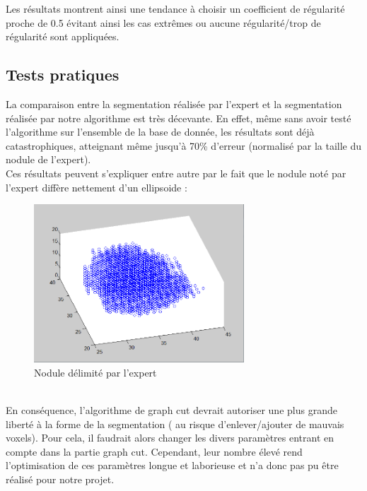 \documentclass{article}
\begin{document}
Les résultats montrent ainsi une tendance à choisir un coefficient de régularité proche de 0.5 évitant ainsi les cas extrêmes ou aucune régularité/trop de régularité sont appliquées.

\subsection{Tests pratiques}

La comparaison entre la segmentation réalisée par l'expert et la segmentation réalisée par notre algorithme est très décevante. En effet, même sans avoir testé l'algorithme sur l'ensemble de la base de donnée, les résultats sont déjà catastrophiques, atteignant même jusqu'à 70\% d'erreur (normalisé par la taille du nodule de l'expert).\\
Ces résultats peuvent s'expliquer entre autre par le fait que le nodule noté par l'expert diffère nettement d'un ellipsoide :
\begin{figure}[!h]
	\begin{center}
		\includegraphics[width=0.7\textwidth]{Images/Tests/forme_expert.png} 
	\end{center}
	\caption{Nodule délimité par l'expert}
	\label{fig:expert_nodule}
\end{figure}
\\En conséquence, l'algorithme de graph cut devrait autoriser une plus grande liberté à la forme de la segmentation ( au risque d'enlever/ajouter de mauvais voxels). Pour cela, il faudrait alors changer les divers paramètres entrant en compte dans la partie graph cut. Cependant, leur nombre élevé rend l'optimisation de ces paramètres longue et laborieuse et n'a donc pas pu être réalisé pour notre projet.
\end{document}
